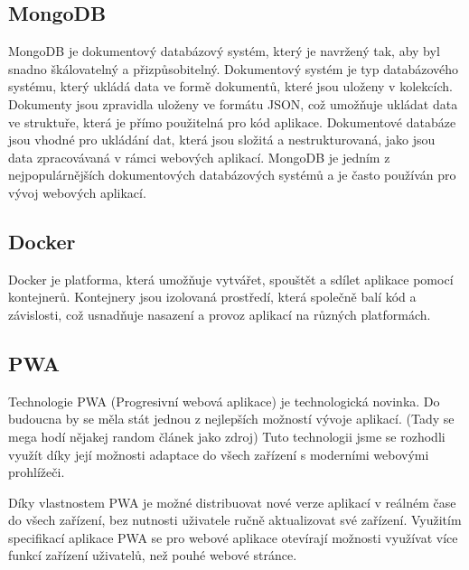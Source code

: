 \subsection{MongoDB}\label{mongo}
MongoDB je dokumentový databázový systém, který je navržený tak, aby byl snadno škálovatelný a přizpůsobitelný. Dokumentový systém je typ databázového systému, který ukládá data ve formě dokumentů, které jsou uloženy v kolekcích. Dokumenty jsou zpravidla uloženy ve formátu JSON, což umožňuje ukládat data ve struktuře, která je přímo použitelná pro kód aplikace. Dokumentové databáze jsou vhodné pro ukládání dat, která jsou složitá a nestrukturovaná, jako jsou data zpracovávaná v rámci webových aplikací. MongoDB je jedním z nejpopulárnějších dokumentových databázových systémů a je často používán pro vývoj webových aplikací.

\subsection{Docker}
Docker je platforma, která umožňuje vytvářet, spouštět a sdílet aplikace pomocí kontejnerů. Kontejnery jsou izolovaná prostředí, která společně balí kód a závislosti, což usnadňuje nasazení a provoz aplikací na různých platformách.

\subsection{PWA}\label{pwa}
Technologie PWA (Progresivní webová aplikace) je technologická novinka. Do budoucna by se měla stát jednou z nejlepších možností vývoje aplikací. (Tady se mega hodí nějakej random článek jako zdroj)
Tuto technologii jsme se rozhodli využít díky její možnosti adaptace do všech zařízení s moderními webovými prohlížeči.

Díky vlastnostem PWA je možné distribuovat nové verze aplikací v reálném čase do všech zařízení, bez nutnosti uživatele ručně aktualizovat své zařízení.
Využitím specifikací aplikace PWA se pro webové aplikace otevírají možnosti využívat více funkcí zařízení uživatelů, než pouhé webové stránce.